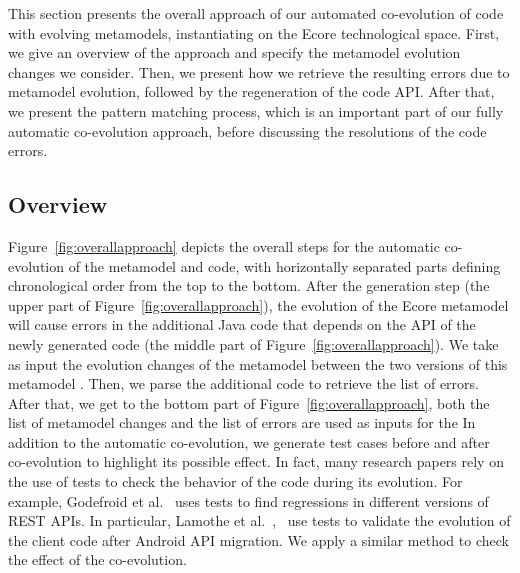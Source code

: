 This section presents the overall approach of our automated co-evolution of code with evolving metamodels,  instantiating on the Ecore technological space. First, we give an overview of the approach and specify the metamodel evolution changes we consider. 
%
Then, we present how we retrieve the resulting errors due to metamodel evolution, followed by the regeneration of the code API. 
After that, we present the pattern matching process, which is an important part of our fully automatic co-evolution approach, before discussing the resolutions of the code errors. 

\subsection{Overview}
\label{Overview}
Figure~\ref{fig:overallapproach} depicts the overall steps for the automatic co-evolution of the metamodel and code, with horizontally separated parts defining chronological order from the top to the bottom.
After the generation step (the upper part of Figure~\ref{fig:overallapproach}), the evolution of the Ecore metamodel will cause errors in the additional Java code that depends on the API of the newly generated code (the middle part of Figure~\ref{fig:overallapproach}). We take as input the evolution changes of the metamodel between the two versions of this metamodel {\small{}}. Then, we parse the additional code  {\small{}} to retrieve the list of errors. 
After that, we get to the bottom part of Figure~\ref{fig:overallapproach}, both the list of metamodel changes and the list of errors are used as inputs for the  
In addition to the automatic co-evolution, we generate test cases before and after co-evolution to highlight its possible effect. In fact, many research papers rely on the use of tests to check the behavior of the code during its evolution. For example, Godefroid et al.~\cite{10.1145/3395363.3397374} uses tests to find regressions in different versions of REST APIs. In particular, Lamothe et al.~\cite{9079197},~\cite{10.1145/3387905.3388608} use tests to validate the evolution of the client code after Android API migration. We apply a similar method to check the effect of the co-evolution. 
